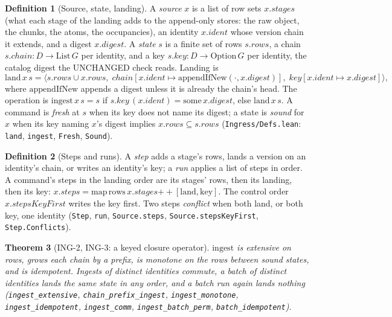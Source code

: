 \documentclass[11pt]{article}
\theoremstyle{plain}
\newtheorem{theorem}{Theorem}[section]
\theoremstyle{definition}
\newtheorem{definition}[theorem]{Definition}
\theoremstyle{remark}
\newcommand{\lean}[1]{\texttt{#1}}
\newcommand{\ing}[1]{ING-#1}
\begin{document}
\begin{definition}[Source, state, landing]
A \emph{source} $x$ is a list of row sets $x.\mathit{stages}$ (what each stage of the landing
adds to the append-only stores: the raw object, the chunks, the atoms, the occupancies), an
identity $x.\mathit{ident}$ whose version chain it extends, and a digest $x.\mathit{digest}$.
A \emph{state} $s$ is a finite set of rows $s.\mathit{rows}$, a chain $s.\mathit{chain} : D \to
\mathrm{List}\,G$ per identity, and a key $s.\mathit{key} : D \to \mathrm{Option}\,G$ per
identity, the catalog digest the UNCHANGED check reads. Landing is
\[
\mathrm{land}\,x\,s = \langle s.\mathit{rows} \cup x.\mathit{rows},\;
  \mathit{chain}[x.\mathit{ident} \mapsto \mathrm{appendIfNew}(\cdot, x.\mathit{digest})],\;
  \mathit{key}[x.\mathit{ident} \mapsto x.\mathit{digest}]\rangle,
\]
where $\mathrm{appendIfNew}$ appends a digest unless it is already the chain's head. The
operation is $\mathrm{ingest}\,x\,s = s$ if $s.\mathit{key}\,(x.\mathit{ident}) =
\mathrm{some}\,x.\mathit{digest}$, else $\mathrm{land}\,x\,s$. A command is \emph{fresh} at $s$
when its key does not name its digest; a state is \emph{sound} for $x$ when its key naming
$x$'s digest implies $x.\mathit{rows} \subseteq s.\mathit{rows}$
(\lean{Ingress/Defs.lean}: \lean{land}, \lean{ingest}, \lean{Fresh}, \lean{Sound}).
\end{definition}

\begin{definition}[Steps and runs]
A \emph{step} adds a stage's rows, lands a version on an identity's chain, or writes an
identity's key; a \emph{run} applies a list of steps in order. A command's steps in the landing
order are its stages' rows, then its landing, then its key: $x.\mathit{steps} =
\mathrm{map}\,\mathrm{rows}\,x.\mathit{stages} \mathbin{+\!\!+} [\mathrm{land}, \mathrm{key}]$.
The control order $x.\mathit{stepsKeyFirst}$ writes the key first. Two steps \emph{conflict}
when both land, or both key, one identity (\lean{Step}, \lean{run}, \lean{Source.steps},
\lean{Source.stepsKeyFirst}, \lean{Step.Conflicts}).
\end{definition}

\begin{theorem}[\ing{2}, \ing{3}: a keyed closure operator]
$\mathrm{ingest}$ is extensive on rows, grows each chain by a prefix, is monotone on the rows
between sound states, and is idempotent. Ingests of distinct identities commute, a batch of
distinct identities lands the same state in any order, and a batch run again lands nothing
(\lean{ingest\_extensive}, \lean{chain\_prefix\_ingest}, \lean{ingest\_monotone},
\lean{ingest\_idempotent}, \lean{ingest\_comm}, \lean{ingest\_batch\_perm},
\lean{batch\_idempotent}).
\end{theorem}
\end{document}

